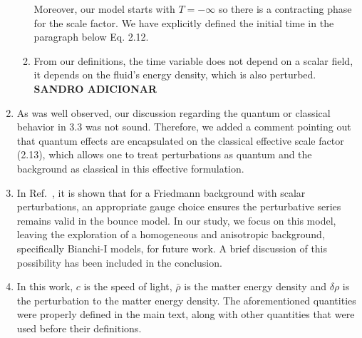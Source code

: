 \documentclass[a4paper,11pt]{article}
\begin{document}
\begin{enumerate}
\begin{enumerate}
        Moreover, our model starts with $T = -\infty$ so there is a contracting phase for the scale factor. We have explicitly defined the initial time in the paragraph below Eq. 2.12.

        \item From our definitions, the time variable does not depend on a scalar field, it depends on the fluid's energy density, which is also perturbed. \textbf{SANDRO ADICIONAR}
        
    \end{enumerate}

    \item As was well observed, our discussion regarding the quantum or classical behavior in 3.3 was not sound. Therefore, we added a comment pointing out that quantum effects are encapsulated on the classical effective scale factor (2.13), which allows one to treat perturbations as quantum and the background as classical in this effective formulation.

    \item In Ref.~\cite{vitenti}, it is shown that for a Friedmann background with scalar perturbations, an appropriate gauge choice ensures the perturbative series remains valid in the bounce model. In our study, we focus on this model, leaving the exploration of a homogeneous and anisotropic background, specifically Bianchi-I models, for future work. A brief discussion of this possibility has been included in the conclusion.

    \item In this work, $c$ is the speed of light, $\bar{\rho}$ is the matter energy density and $\delta\rho$ is the perturbation to the matter energy density. The aforementioned quantities were properly defined in the main text, along with other quantities that were used before their definitions. 
    
\end{enumerate}



\end{document}
